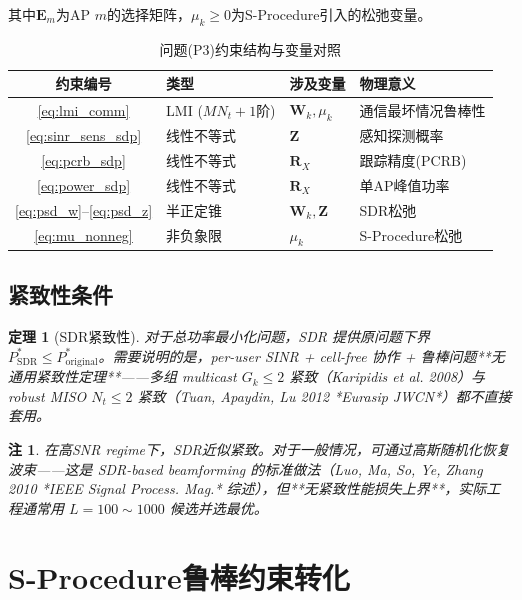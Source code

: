 \documentclass[12pt,a4paper]{article}
\newtheorem{theorem}{定理}
\newtheorem{remark}{注}
\newcommand{\mat}[1]{\mathbf{#1}}
\begin{document}
其中$\mat{E}_m$为AP $m$的选择矩阵，$\mu_k \geq 0$为S-Procedure引入的松弛变量。

\begin{table}[htbp]
\centering
\caption{问题(P3)约束结构与变量对照}\label{tab:p3_structure}
\begin{tabular}{clll}
\toprule
约束编号 & 类型 & 涉及变量 & 物理意义 \\
\midrule
\eqref{eq:lmi_comm} & LMI ($MN_t+1$阶) & $\mat{W}_k, \mu_k$ & 通信最坏情况鲁棒性 \\
\eqref{eq:sinr_sens_sdp} & 线性不等式 & $\mat{Z}$ & 感知探测概率 \\
\eqref{eq:pcrb_sdp} & 线性不等式 & $\mat{R}_X$ & 跟踪精度(PCRB) \\
\eqref{eq:power_sdp} & 线性不等式 & $\mat{R}_X$ & 单AP峰值功率 \\
\eqref{eq:psd_w}--\eqref{eq:psd_z} & 半正定锥 & $\mat{W}_k, \mat{Z}$ & SDR松弛 \\
\eqref{eq:mu_nonneg} & 非负象限 & $\mu_k$ & S-Procedure松弛 \\
\bottomrule
\end{tabular}
\end{table}



\subsection{紧致性条件}

\begin{theorem}[SDR紧致性]\label{thm:1}
对于总功率最小化问题，SDR 提供原问题下界 $P_{\text{SDR}}^* \leq P_{\text{original}}^*$。需要说明的是，per-user SINR + cell-free 协作 + 鲁棒问题**无通用紧致性定理**——多组 multicast $G_k \leq 2$ 紧致（Karipidis et al. 2008）与 robust MISO $N_t \leq 2$ 紧致（Tuan, Apaydin, Lu 2012 *Eurasip JWCN*）都不直接套用。
\end{theorem}

\begin{remark}
在高SNR regime下，SDR近似紧致。对于一般情况，可通过高斯随机化恢复波束——这是 SDR-based beamforming 的标准做法（Luo, Ma, So, Ye, Zhang 2010 *IEEE Signal Process. Mag.* 综述），但**无紧致性能损失上界**，实际工程通常用 $L = 100 \sim 1000$ 候选并选最优。
\end{remark}

\section{S-Procedure鲁棒约束转化}
\end{document}
